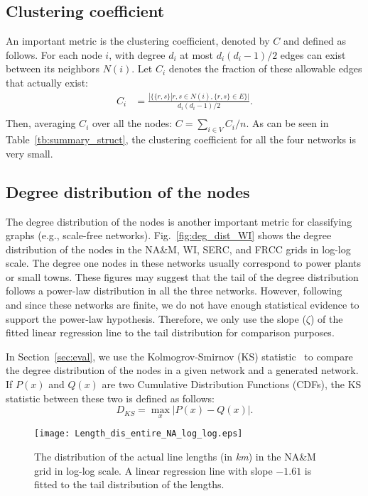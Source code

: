\documentclass[10pt,journal]{IEEEtran}
\begin{document}
\subsection{Clustering coefficient}
An important metric is the clustering coefficient, denoted by $C$ and defined as follows. For each node $i$, with degree $d_i$ at most $d_i(d_i-1)/2$ edges can exist
between its neighbors $N(i)$. Let $C_i$ denotes the fraction of these allowable edges that actually exist:
\begin{align*}
C_i &= \frac{|\{\{r,s\}|r,s\in N(i),\{r,s\}\in E\}|}{d_i(d_i-1)/2}.\\
\end{align*}
Then, averaging $C_i$ over all the nodes: $C = \sum_{i\in V} C_i / n$.
As can be seen in Table~\ref{tb:summary_struct}, the clustering coefficient for all the four networks is very small.




\subsection{Degree distribution of the nodes}
The degree distribution of the nodes is another important metric for classifying graphs (e.g., scale-free networks). Fig.~\ref{fig:deg_dist_WI} shows the degree distribution of the nodes in the NA\&M, WI, SERC, and FRCC grids in log-log scale. The degree one nodes in these networks usually correspond to power plants or small towns. These figures may suggest that the tail of the degree distribution follows a power-law distribution in all the three networks. However, following~\cite{clauset2009power} and since these networks are finite, we do not have enough statistical evidence to support the power-law hypothesis. Therefore, we only use the slope ($\zeta$) of the fitted linear regression line to the tail distribution for comparison purposes.

In Section~\ref{sec:eval}, we  use the Kolmogrov-Smirnov (KS) statistic~\cite{press2007numerical} to compare the degree distribution of the nodes in a given network and a generated network. If $P(x)$ and $Q(x)$ are two Cumulative Distribution Functions (CDFs), the KS statistic between these two is defined as follows:
\begin{equation*}
D_{KS} = \max_x |P(x)-Q(x)|.
\end{equation*}




\begin{figure}[t]
\centering
\vspace*{-0.2cm}
\texttt{[image: Length\_dis\_entire\_NA\_log\_log.eps]}
\vspace*{-0.2cm}
\caption{The distribution of the actual line lengths (in \emph{km}) in the NA\&M grid in log-log scale. A linear regression line with slope $-1.61$ is fitted to the tail distribution of the lengths.}
\label{fig:dist_lines_NA}
\vspace*{0.2cm}
\end{figure}
\end{document}
